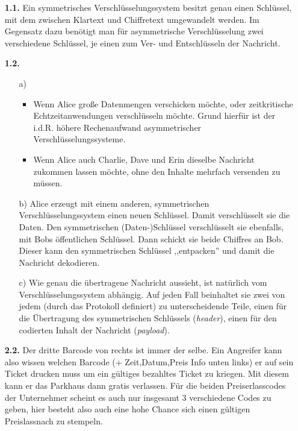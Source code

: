 \documentclass[a4paper,11pt]{article}
\author{\authorinfo}
\title{\titleinfo}
\date{\today}
\begin{document}
\maketitle

\begin{enumerate}

\item[\textbf{1.1.}]
    Ein symmetrisches Verschlüsselungssystem besitzt genau einen Schlüssel, mit dem zwischen Klartext und Chiffretext umgewandelt werden. Im Gegensatz dazu benötigt man für asymmetrische Verschlüsselung zwei verschiedene Schlüssel, je einen zum Ver- und Entschlüsseln der Nachricht.

\item[\textbf{1.2.}]
    \begin{itemize}
        \item[a)]
            \begin{itemize}
                \item Wenn Alice große Datenmengen verschicken möchte, oder zeitkritische Echtzeitanwendungen verschlüsseln möchte. Grund hierfür ist der i.d.R. höhere Rechenaufwand asymmetrischer Verschlüsselungssysteme.
                \item Wenn Alice auch Charlie, Dave und Erin dieselbe Nachricht zukommen lassen möchte, ohne den Inhalte mehrfach versenden zu müssen.
            \end{itemize}

        \item[b)]
            Alice erzeugt mit einem anderen, symmetrischen Verschlüsselungssystem einen neuen Schlüssel. Damit verschlüsselt sie die Daten. Den symmetrischen (Daten-)Schlüssel verschlüsselt sie ebenfalls, mit Bobs öffentlichen Schlüssel. Dann schickt sie beide Chiffres an Bob. Dieser kann den symmetrischen Schlüssel ,,entpacken'' und damit die Nachricht dekodieren.

        \item[c)]
            Wie genau die übertragene Nachricht aussieht, ist natürlich vom Verschlüsselungssystem abhängig. Auf jeden Fall beinhaltet sie zwei von jedem (durch das Protokoll definiert) zu unterscheidende Teile, einen für die Übertragung des symmetrischen Schlüssels (\emph{header}), einen für den codierten Inhalt der Nachricht (\emph{payload}).

    \end{itemize}

\item[\textbf{2.2.}]
    Der dritte Barcode von rechts ist immer der selbe. Ein Angreifer kann also wissen welchen Barcode (+ Zeit,Datum,Preis Info unten links) er auf sein Ticket drucken muss um ein gültiges bezahltes Ticket zu kriegen. Mit diesem kann er das Parkhaus dann gratis verlassen.
    Für die beiden Preiserlasscodes der Unternehmer scheint es auch nur insgesamt 3 verschiedene Codes zu geben, hier besteht also auch eine hohe Chance sich einen gültigen Preislassnach zu stempeln.


\end{enumerate}
\end{document}
